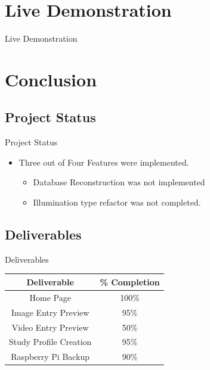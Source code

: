 \documentclass[17pt, aspectratio=169]{beamer}
\begin{document}
\section*{Live Demonstration}
\begin{frame}
	\begin{huge}
		\begin{center}
			Live Demonstration
		\end{center}
	\end{huge}
\end{frame}
\section{Conclusion}
\subsection*{Project Status}
\begin{frame}{Project Status}
	\begin{itemize}
		\item Three out of Four Features were implemented.
		      \begin{itemize}
			      \item Database Reconstruction was not implemented
			      \item Illumination type refactor  was not completed.
		      \end{itemize}
	\end{itemize}
\end{frame}
\subsection{Deliverables}
\begin{frame}{Deliverables}
	\begin{center}
		\begin{tabular}{||c | c||}
			\hline
			Deliverable            & \% Completion \\
			\hline
			Home Page              & 100\%         \\
			\hline
			Image Entry Preview    & 95\%          \\
			\hline
			Video Entry Preview    & 50\%          \\
			\hline
			Study Profile Creation & 95\%          \\
			\hline
			Raspberry Pi Backup    & 90\%          \\
			\hline
		\end{tabular}
	\end{center}
\end{frame}
\end{document}
